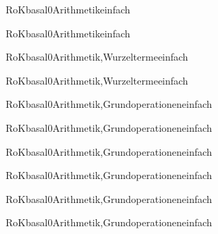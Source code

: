 \documentclass[12pt]{article}
\begin{document}
\begin{Add}{RoK}{basal0}{Arithmetik}{einfach}
\solution{ }
\end{Add}
\begin{Add}{RoK}{basal0}{Arithmetik}{einfach}
\end{Add}

\begin{Add}{RoK}{basal0}{Arithmetik,Wurzelterme}{einfach}
\solution{ }
\end{Add}
\begin{Add}{RoK}{basal0}{Arithmetik,Wurzelterme}{einfach}
\end{Add}

    \begin{Add}{RoK}{basal0}{Arithmetik,Grundoperationen}{einfach}
    \solution{ }
    \end{Add}
    \begin{Add}{RoK}{basal0}{Arithmetik,Grundoperationen}{einfach}
    \end{Add}
    

    \begin{Add}{RoK}{basal0}{Arithmetik,Grundoperationen}{einfach}
    \solution{ }
    \end{Add}
    \begin{Add}{RoK}{basal0}{Arithmetik,Grundoperationen}{einfach}
    \end{Add}
    

    \begin{Add}{RoK}{basal0}{Arithmetik,Grundoperationen}{einfach}
    \solution{ }
    \end{Add}
    \begin{Add}{RoK}{basal0}{Arithmetik,Grundoperationen}{einfach}
    \end{Add}
    
\end{document}
